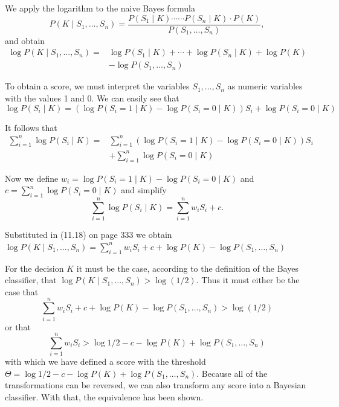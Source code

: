 \documentclass[10pt]{book}
\begin{document}
We apply the logarithm to the naive Bayes formula
$$
P\left(K \mid S_{1}, \ldots, S_{n}\right)=\frac{P\left(S_{1} \mid K\right) \cdots \cdots P\left(S_{n} \mid K\right) \cdot P(K)}{P\left(S_{1}, \ldots, S_{n}\right)},
$$
and obtain
$$
\begin{align*}
\log P\left(K \mid S_{1}, \ldots, S_{n}\right)= & \log P\left(S_{1} \mid K\right)+\cdots+\log P\left(S_{n} \mid K\right)+\log P(K) \\
& -\log P\left(S_{1}, \ldots, S_{n}\right) \tag{11.18}
\end{align*}
$$

To obtain a score, we must interpret the variables $S_{1}, \ldots, S_{n}$ as numeric variables with the values 1 and 0. We can easily see that
$$
\log P\left(S_{i} \mid K\right)=\left(\log P\left(S_{i}=1 \mid K\right)-\log P\left(S_{i}=0 \mid K\right)\right) S_{i}+\log P\left(S_{i}=0 \mid K\right)
$$

It follows that
$$
\begin{aligned}
\sum_{i=1}^{n} \log P\left(S_{i} \mid K\right)= & \sum_{i=1}^{n}\left(\log P\left(S_{i}=1 \mid K\right)-\log P\left(S_{i}=0 \mid K\right)\right) S_{i} \\
& +\sum_{i=1}^{n} \log P\left(S_{i}=0 \mid K\right)
\end{aligned}
$$

Now we define $w_{i}=\log P\left(S_{i}=1 \mid K\right)-\log P\left(S_{i}=0 \mid K\right)$ and $c=\sum_{i=1}^{n} \log P\left(S_{i}=0 \mid K\right)$ and simplify
$$
\sum_{i=1}^{n} \log P\left(S_{i} \mid K\right)=\sum_{i=1}^{n} w_{i} S_{i}+c .
$$

Substituted in (11.18) on page 333 we obtain
$
\log P\left(K \mid S_{1}, \ldots, S_{n}\right)=\sum_{i=1}^{n} w_{i} S_{i}+c+\log P(K)-\log P\left(S_{1}, \ldots, S_{n}\right)
$

For the decision $K$ it must be the case, according to the definition of the Bayes classifier, that $\log P\left(K \mid S_{1}, \ldots, S_{n}\right)>\log (1 / 2)$. Thus it must either be the case that
$$
\sum_{i=1}^{n} w_{i} S_{i}+c+\log P(K)-\log P\left(S_{1}, \ldots, S_{n}\right)>\log (1 / 2)
$$
or that
$$
\sum_{i=1}^{n} w_{i} S_{i}>\log 1 / 2-c-\log P(K)+\log P\left(S_{1}, \ldots, S_{n}\right)
$$
with which we have defined a score with the threshold $\Theta=\log 1 / 2-c-\log P(K)+\log P\left(S_{1}, \ldots, S_{n}\right)$. Because all of the transformations can be reversed, we can also transform any score into a Bayesian classifier. With that, the equivalence has been shown.
\end{document}
